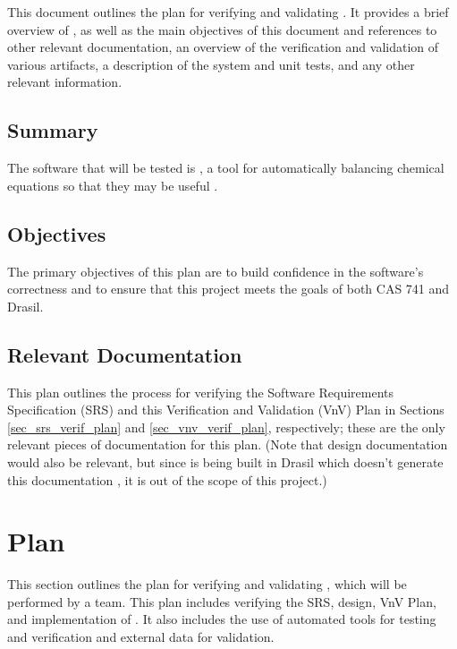 \documentclass[12pt, titlepage]{article}
\begin{document}
This document outlines the plan for verifying and validating \progname{}. It
provides a brief overview of \progname{}, as well as the main objectives of
this document and references to other relevant documentation, an overview of
the verification and validation of various artifacts, a description of the
system and unit tests, and any other relevant information.

\subsection{Summary}

The software that will be tested is \progname{}, a tool for automatically
balancing chemical equations so that they may be useful
\cite{lund_introduction_2023}.

\subsection{Objectives}

The primary objectives of this plan are to build confidence in the software's
correctness and to ensure that this project meets the goals of both CAS 741 and
Drasil.

\subsection{Relevant Documentation}

This plan outlines the process for verifying the Software Requirements
Specification (SRS) \cite{srs} and this Verification and Validation
(VnV) Plan in Sections \ref{sec_srs_verif_plan} and \ref{sec_vnv_verif_plan},
respectively; these are the only relevant pieces of documentation for this
plan. (Note that design documentation would also be relevant, but since
\progname{} is being built in Drasil which doesn't generate this documentation
\cite{carette_drasil_2021}, it is out of the scope of this project.)

\section{Plan} \label{sec_plan}

This section outlines the plan for verifying and validating \progname{}, which
will be performed by a team. This plan includes verifying the SRS,
design, VnV Plan, and implementation of \progname{}. It also includes the use
of automated tools for testing and verification and external data for
validation.
\end{document}
